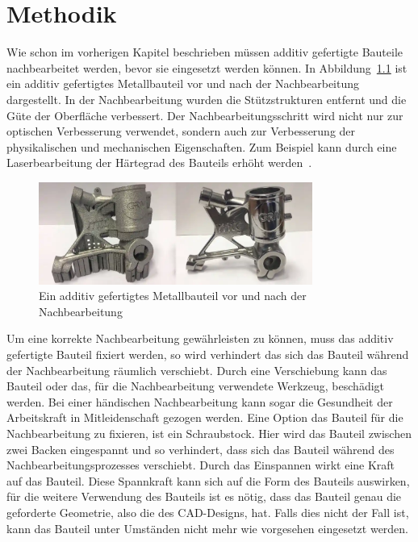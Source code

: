 \chapter{Methodik}

Wie schon im vorherigen Kapitel beschrieben müssen additiv gefertigte Bauteile 
nachbearbeitet werden, bevor sie eingesetzt werden können. In Abbildung~\ref{fig:post-pro}
ist ein additiv gefertigtes Metallbauteil vor und nach der Nachbearbeitung dargestellt.
In der Nachbearbeitung wurden die Stützstrukturen entfernt und die Güte der Oberfläche 
verbessert. 
Der Nachbearbeitungsschritt wird nicht nur zur optischen Verbesserung verwendet, sondern 
auch zur Verbesserung der physikalischen und mechanischen Eigenschaften. 
Zum Beispiel kann durch eine Laserbearbeitung der Härtegrad des Bauteils erhöht 
werden~\cite{Mahmood.2022}.

\begin{figure}[H]
    \centering
    \includegraphics[width=0.8\textwidth]{images/post-processing.PNG}
    \caption{Ein additiv gefertigtes Metallbauteil vor und nach der Nachbearbeitung
    ~\cite{unionfab.22.08.2023}}
    \label{fig:post-pro}
\end{figure}

Um eine korrekte Nachbearbeitung gewährleisten zu können, muss das additiv 
gefertigte Bauteil fixiert werden, so wird verhindert das sich das Bauteil während der 
Nachbearbeitung räumlich verschiebt. Durch eine Verschiebung kann das Bauteil oder das, für
die Nachbearbeitung verwendete Werkzeug, beschädigt werden. Bei einer händischen 
Nachbearbeitung kann sogar die Gesundheit der Arbeitskraft in Mitleidenschaft gezogen werden.
Eine Option das Bauteil für die Nachbearbeitung zu fixieren, ist ein Schraubstock. 
Hier wird das Bauteil zwischen zwei Backen eingespannt und so verhindert, dass sich das
Bauteil während des Nachbearbeitungsprozesses verschiebt. Durch das Einspannen wirkt eine 
Kraft auf das Bauteil. Diese Spannkraft kann sich auf die Form des Bauteils auswirken, für 
die weitere Verwendung des Bauteils ist es nötig, dass das Bauteil genau die geforderte 
Geometrie, also die des CAD-Designs, hat. Falls dies nicht der Fall ist, kann das Bauteil
unter Umständen nicht mehr wie vorgesehen eingesetzt werden.


